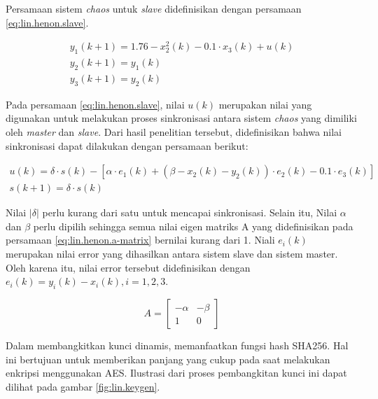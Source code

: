 Persamaan sistem \emph{chaos} untuk \emph{slave} didefinisikan dengan persamaan \ref{eq:lin.henon.slave}.

\begin{equation}
  \label{eq:lin.henon.slave}
  \begin{array}{l}   
    y_1(k+1) = 1.76 - x_2^2(k) - 0.1 \cdot x_3(k) + u(k)\\
    y_2(k+1) = y_1(k)\\
    y_3(k+1) = y_2(k)
  \end{array}
\end{equation}

Pada persamaan \ref{eq:lin.henon.slave}, nilai $u(k)$ merupakan nilai yang digunakan untuk melakukan proses sinkronisasi antara sistem \emph{chaos} yang dimiliki oleh \emph{master} dan \emph{slave}. Dari hasil penelitian tersebut, didefinisikan bahwa nilai sinkronisasi dapat dilakukan dengan persamaan berikut:

\begin{equation}
  \label{eq:lin.henon.sync}
  \begin{array}{l}   
    u(k) = \delta \cdot s(k) - [\alpha \cdot e_1(k) + (\beta - x_2(k) - y_2(k)) \cdot e_2(k) - 0.1 \cdot e_3(k)]\\
    s(k+1) = \delta \cdot s(k)
  \end{array}
\end{equation}

Nilai $|\delta|$ perlu kurang dari satu untuk mencapai sinkronisasi. Selain itu, Nilai $\alpha$ dan $\beta$ perlu dipilih sehingga semua nilai eigen matriks A yang didefinisikan pada persamaan \ref{eq:lin.henon.a-matrix} bernilai kurang dari 1. Niali $e_i(k)$ merupakan nilai error yang dihasilkan antara sistem slave dan sistem master. Oleh karena itu, nilai error tersebut didefinisikan dengan $e_i(k) = y_i(k) - x_i(k), i = 1,2,3$.

\begin{equation}
\label{eq:lin.henon.a-matrix}
A = \begin{bmatrix}
  -\alpha & -\beta \\
  1 & 0 
  \end{bmatrix}
\end{equation}

Dalam membangkitkan kunci dinamis, \textcite{lin2021} memanfaatkan fungsi hash SHA256. Hal ini bertujuan untuk memberikan panjang yang cukup pada saat melakukan enkripsi menggunakan AES. Ilustrasi dari proses pembangkitan kunci ini dapat dilihat pada gambar \ref{fig:lin.keygen}.

